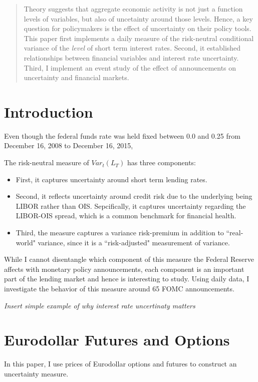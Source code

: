 \documentclass[11pt]{article}
\begin{document}
\maketitle

\begin{abstract}
 Theory suggests that aggregate economic activity is not just a function levels of variables, but also of uncetainty around those levels. Hence, a key question for policymakers is the effect of uncertainty on their policy tools. This paper first implements a daily measure of the risk-neutral conditional variance of the \textit{level} of short term interest rates. Second, it established relationships between financial variables and interest rate uncertainty. Third, I implement an event study of the effect of announcements on uncertainty and financial markets. \\
 
\end{abstract}

\section{Introduction}
Even though the federal funds rate was held fixed between 0.0 and 0.25 from December 16, 2008 to December 16, 2015,   

The risk-neutral measure of $Var_{t}(L_{T})$ has three components:
\begin{itemize}
	\item First, it captures uncertainty around short term lending rates. 
	\item Second, it reflects uncertainty around credit risk due to the underlying being LIBOR rather than OIS. Sepcifically, it captures uncertainty regarding the LIBOR-OIS spread, which is a common benchmark for financial health.  
	\item Third, the measure captures a variance risk-premium in addition to ``real-world" variance, since it is a ``risk-adjusted" measurement of variance. 
\end{itemize}
While I cannot disentangle which component of this measure the Federal Reserve affects with monetary policy announcements, each component is an important part of the lending market and hence is interesting to study.  Using daily data, I investigate the behavior of this measure around 65 FOMC announcements.  

\textit{Insert simple example of why interest rate uncertinaty matters}
\section{Eurodollar Futures and Options}
In this paper, I use prices of Eurodollar options and futures to construct an uncertainty measure. 
\end{document}

